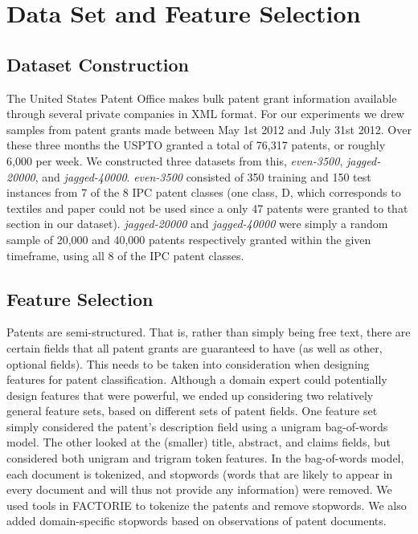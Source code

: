 \section{Data Set and Feature Selection}

\subsection{Dataset Construction}
The United States Patent Office makes bulk patent grant information available through several private companies\cite{USPTO:2013:patent-catalog} in XML format\cite{USPTO:2013:dtd}. For our experiments we drew samples from patent grants made between May 1st 2012 and July 31st 2012. Over these three months the USPTO granted a total of 76,317 patents, or roughly 6,000 per week. We constructed three datasets from this, \emph{even-3500}, \emph{jagged-20000}, and \emph{jagged-40000}. \emph{even-3500} consisted of 350 training and 150 test instances from 7 of the 8 IPC patent classes (one class, D, which corresponds to textiles and paper could not be used since a only 47 patents were granted to that section in our dataset). \emph{jagged-20000} and \emph{jagged-40000} were simply a random sample of 20,000 and 40,000 patents respectively granted within the given timeframe, using all 8 of the IPC patent classes.

\subsection{Feature Selection}
Patents are semi-structured. That is, rather than simply being free text, there are certain fields that all patent grants are guaranteed to have (as well as other, optional fields). This needs to be taken into consideration when designing features for patent classification. Although a domain expert could potentially design features that were powerful, we ended up considering two relatively general feature sets, based on different sets of patent fields. One feature set simply considered the patent's description field using a unigram bag-of-words model. The other looked at the (smaller) title, abstract, and claims fields, but considered both unigram and trigram token features. In the bag-of-words model, each document is tokenized, and stopwords (words that are likely to appear in every document and will thus not provide any information) were removed. We used tools in FACTORIE to tokenize the patents and remove stopwords. We also added domain-specific stopwords based on observations of patent documents. 
\indent

